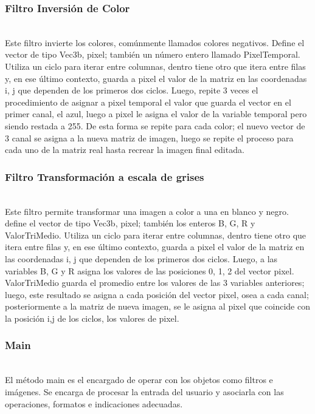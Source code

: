\documentclass[11pt]{article}
\begin{document}
	
\subsubsection{Filtro Inversión de Color}\\

Este filtro invierte los colores, comúnmente llamados colores negativos. Define el vector de tipo Vec3b, pixel; también un número entero llamado PixelTemporal. Utiliza un ciclo para iterar entre columnas, dentro tiene otro que itera entre filas y, en ese último contexto, guarda a pixel el valor de la matriz en las coordenadas i, j que dependen de los primeros dos ciclos. Luego, repite 3 veces el procedimiento de asignar a pixel temporal el valor que guarda el vector en el primer canal, el azul, luego a pixel le asigna el valor de la variable temporal pero siendo restada a 255. De esta forma se repite para cada color; el nuevo vector de 3 canal se asigna a la nueva matriz de imagen, luego se repite el proceso para cada uno de la matriz real hasta recrear la imagen final editada.

\subsubsection{Filtro Transformación a escala de grises}\\


Este filtro permite transformar una imagen a color a una en blanco y negro. define el vector de tipo Vec3b, pixel; también los enteros B, G, R y ValorTriMedio. Utiliza un ciclo para iterar entre columnas, dentro tiene otro que itera entre filas y, en ese último contexto, guarda a pixel el valor de la matriz en las coordenadas i, j que dependen de los primeros dos ciclos. Luego, a las variables B, G y R asigna los valores de las posiciones 0, 1, 2 del vector pixel. ValorTriMedio guarda el promedio entre los valores de las 3 variables anteriores; luego, este resultado se asigna a cada posición del vector pixel, osea a cada canal; posteriormente a la matriz de nueva imagen, se le asigna al pixel que coincide con la posición i,j de los ciclos, los valores de pixel.

\subsubsection{Main}\\

El método main es el encargado de operar con los objetos como filtros e imágenes. Se encarga de procesar la entrada del usuario y asociarla con las operaciones, formatos e indicaciones adecuadas.
\end{document}
